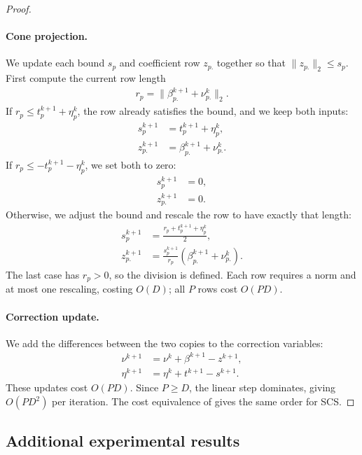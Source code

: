 \begin{proof}
\paragraph{Cone projection.}
We update each bound $s_p$ and coefficient row $z_{p.}$ together so that $\|z_{p.}\|_2\leq s_p$.
First compute the current row length
\begin{align}
r_p=\|\beta_{p.}^{k+1}+\nu_{p.}^k\|_2.
\end{align}
If $r_p\leq t_p^{k+1}+\eta_p^k$, the row already satisfies the bound, and we keep both inputs:
\begin{align}
s_p^{k+1}&=t_p^{k+1}+\eta_p^k, \\
z_{p.}^{k+1}&=\beta_{p.}^{k+1}+\nu_{p.}^k.
\end{align}
If $r_p\leq-t_p^{k+1}-\eta_p^k$, we set both to zero:
\begin{align}
s_p^{k+1}&=0, \\
z_{p.}^{k+1}&=0.
\end{align}
Otherwise, we adjust the bound and rescale the row to have exactly that length:
\begin{align}
s_p^{k+1}&=\frac{r_p+t_p^{k+1}+\eta_p^k}{2}, \\
z_{p.}^{k+1}&=\frac{s_p^{k+1}}{r_p}\left(\beta_{p.}^{k+1}+\nu_{p.}^k\right).
\end{align}
The last case has $r_p>0$, so the division is defined.
Each row requires a norm and at most one rescaling, costing $O(D)$; all $P$ rows cost $O(PD)$.

\paragraph{Correction update.}
We add the differences between the two copies to the correction variables:
\begin{align}
\nu^{k+1}&=\nu^k+\beta^{k+1}-z^{k+1}, \\
\eta^{k+1}&=\eta^k+t^{k+1}-s^{k+1}.
\end{align}
These updates cost $O(PD)$.
Since $P\geq D$, the linear step dominates, giving $O(PD^2)$ per iteration.
The cost equivalence of \citet[Section~3.2]{ocpb:16} gives the same order for SCS.
\end{proof}

\clearpage
\subsection{Additional experimental results}
\label{sec:additional_experimental_results}

